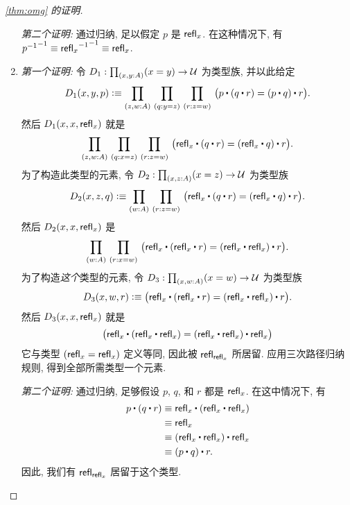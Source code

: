 \begin{proof}[\cref{thm:omg} 的证明]
\begin{enumerate}
\mentalpause

\noindent \emph{第二个证明:} 通过归纳, 足以假定 $p$ 是 $\mathsf{refl}_{x}$.
在这种情况下, 有 $\mathord{{\mathord{{p}^{-1}}}^{-1}}\equiv \mathord{{\mathord{{\mathsf{refl}_{x}}^{-1}}}^{-1}} \equiv \mathsf{refl}_{x}$.

\item \emph{第一个证明:} 令 $D_1:\prd{x,y:A} (x=y) \to \type$ 为类型族, 并以此给定
\begin{equation*}
D_1(x,y,p)\defeq\prd{z,w:A}{q:y= z}{r:z= w} \big(p\ct (q\ct r)= (p\ct q)\ct r\big).
\end{equation*}
然后 $D_1(x,x,\mathsf{refl}_{x})$ 就是
\begin{equation*}
\prd{z,w:A}{q:x= z}{r:z= w} \big(\refl{x}\ct(q\ct r)= (\refl{x}\ct q)\ct r\big).
\end{equation*}
为了构造此类型的元素, 令 $D_2:\prd{x,z:A} (x=z) \to \type$ 为类型族
\begin{equation*}
D_2 (x,z,q) \defeq \prd{w:A}{r:z=w} \big(\refl{x}\ct(q\ct r)= (\refl{x}\ct q)\ct r\big).
\end{equation*}
然后 $D_2(x,x,\mathsf{refl}_{x})$ 是
\begin{equation*}
\prd{w:A}{r:x=w} \big(\refl{x}\ct(\refl{x}\ct r)= (\refl{x}\ct \refl{x})\ct r\big).
\end{equation*}
为了构造\emph{这个}类型的元素, 令 $D_3:\prd{x,w:A} (x=w) \to \type$ 为类型族
\begin{equation*}
D_3(x,w,r) \defeq \big(\refl{x}\ct(\refl{x}\ct r)= (\refl{x}\ct \refl{x})\ct r\big).
\end{equation*}
然后 $D_3(x,x,\mathsf{refl}_{x})$ 就是
\begin{equation*}
\big(\refl{x}\ct(\refl{x}\ct \refl{x})= (\refl{x}\ct \refl{x})\ct \refl{x}\big)
\end{equation*}
它与类型 $(\mathsf{refl}_{x} = \mathsf{refl}_{x})$ 定义等同, 因此被 $\mathsf{refl}_{\mathsf{refl}_{x}}$ 所居留.
应用三次路径归纳规则, 得到全部所需类型一个元素.

\mentalpause

\noindent \emph{第二个证明:} 通过归纳, 足够假设 $p$, $q$, 和 $r$ 都是 $\mathsf{refl}_{x}$.
在这中情况下, 有
\begin{align*}
p\ct (q\ct r)
&\jdeq \refl{x}\ct(\refl{x}\ct \refl{x})\\
&\jdeq \refl{x}\\
&\jdeq (\refl{x}\ct \refl x)\ct \refl x\\
&\jdeq (p\ct q)\ct r.
\end{align*}
因此, 我们有 $\mathsf{refl}_{\mathsf{refl}_{x}}$ 居留于这个类型. \qedhere
\end{enumerate}
\end{proof}

